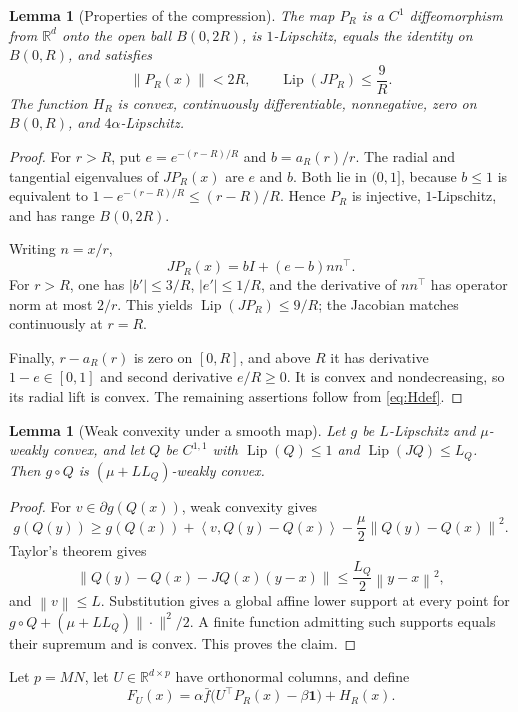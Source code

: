 \documentclass[11pt,a4paper]{article}
\newcommand{\R}{\mathbb{R}}
\newcommand{\one}{\mathbf 1}
\newcommand{\norm}[1]{\left\lVert #1\right\rVert}
\newcommand{\abs}[1]{\left\lvert #1\right\rvert}
\newcommand{\inner}[2]{\left\langle #1,#2\right\rangle}
\newtheorem{lemma}[theorem]{Lemma}
\theoremstyle{definition}
\numberwithin{equation}{section}
\begin{document}
\begin{lemma}[Properties of the compression]\label{lem:compression}
The map $P_R$ is a $C^1$ diffeomorphism from $\R^d$ onto the open ball $B(0,2R)$, is $1$-Lipschitz, equals the identity on $B(0,R)$, and satisfies
\[
 \norm{P_R(x)}<2R,
 \qquad
 \operatorname{Lip}(JP_R)\le\frac9R.
\]
The function $H_R$ is convex, continuously differentiable, nonnegative, zero on $B(0,R)$, and $4\alpha$-Lipschitz.
\end{lemma}

\begin{proof}
For $r>R$, put $e=e^{-(r-R)/R}$ and $b=a_R(r)/r$.  The radial and tangential eigenvalues of $JP_R(x)$ are $e$ and $b$.  Both lie in $(0,1]$, because $b\le1$ is equivalent to $1-e^{-(r-R)/R}\le(r-R)/R$.  Hence $P_R$ is injective, $1$-Lipschitz, and has range $B(0,2R)$.

Writing $n=x/r$,
\[
 JP_R(x)=bI+(e-b)nn^\top.
\]
For $r>R$, one has $\abs{b'}\le3/R$, $\abs{e'}\le1/R$, and the derivative of $nn^\top$ has operator norm at most $2/r$.  This yields $\operatorname{Lip}(JP_R)\le9/R$; the Jacobian matches continuously at $r=R$.

Finally, $r-a_R(r)$ is zero on $[0,R]$, and above $R$ it has derivative $1-e\in[0,1]$ and second derivative $e/R\ge0$.  It is convex and nondecreasing, so its radial lift is convex.  The remaining assertions follow from \eqref{eq:Hdef}.
\end{proof}

\begin{lemma}[Weak convexity under a smooth map]\label{lem:composition}
Let $g$ be $L$-Lipschitz and $\mu$-weakly convex, and let $Q$ be $C^{1,1}$ with $\operatorname{Lip}(Q)\le1$ and $\operatorname{Lip}(JQ)\le L_Q$.  Then $g\circ Q$ is $(\mu+LL_Q)$-weakly convex.
\end{lemma}

\begin{proof}
For $v\in\partial g(Q(x))$, weak convexity gives
\[
 g(Q(y))\ge g(Q(x))+\inner{v}{Q(y)-Q(x)}
 -\frac\mu2\norm{Q(y)-Q(x)}^2.
\]
Taylor's theorem gives
\[
 \norm{Q(y)-Q(x)-JQ(x)(y-x)}
 \le\frac{L_Q}{2}\norm{y-x}^2,
\]
and $\norm v\le L$.  Substitution gives a global affine lower support at every point for
$g\circ Q+(\mu+LL_Q)\|\cdot\|^2/2$. A finite function admitting such
supports equals their supremum and is convex. This proves the claim.
\end{proof}

Let $p=MN$, let $U\in\R^{d\times p}$ have orthonormal columns, and define
\begin{equation}\label{eq:FU}
 F_U(x)=\alpha\bar f\bigl(U^\top P_R(x)-\beta\one\bigr)+H_R(x).
\end{equation}
\end{document}
